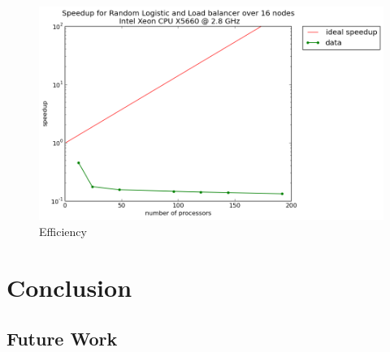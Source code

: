 \documentclass[12pt]{article}
\begin{document}
\begin{figure}[H]
	\begin{center}
		\includegraphics[scale=0.5]{speedup_random_logistic}
\caption{Efficiency}
	\end{center}
\end{figure}

\section{Conclusion}
\subsection{Future Work}



\end{document}
